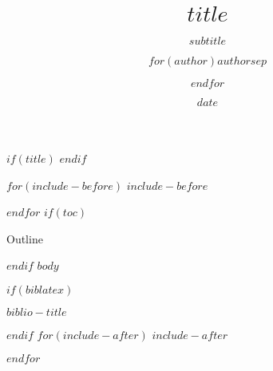 \documentclass[$if(fontsize)$$fontsize$,$endif$$if(lang)$$babel-lang$,$endif$$if(handout)$handout,$endif$$if(beamer)$ignorenonframetext,$endif$$for(classoption)$$classoption$$sep$,$endfor$$if(make149)$,aspectratio=149$endif$]{$documentclass$}
\title{$title$}
\subtitle{$subtitle$}
\author{$for(author)$$author$$sep$ \and $endfor$}
\date{$date$}
\begin{document}
$if(title)$
\frame{\titlepage}
$endif$

$for(include-before)$
$include-before$

$endfor$
$if(toc)$
\begin{frame}{Outline}
  \tableofcontents
\end{frame}

$endif$
$body$

$if(biblatex)$
\begin{frame}[allowframebreaks]{$biblio-title$}
  \printbibliography[heading=none]
\end{frame}

$endif$
$for(include-after)$
$include-after$

$endfor$
\end{document}
